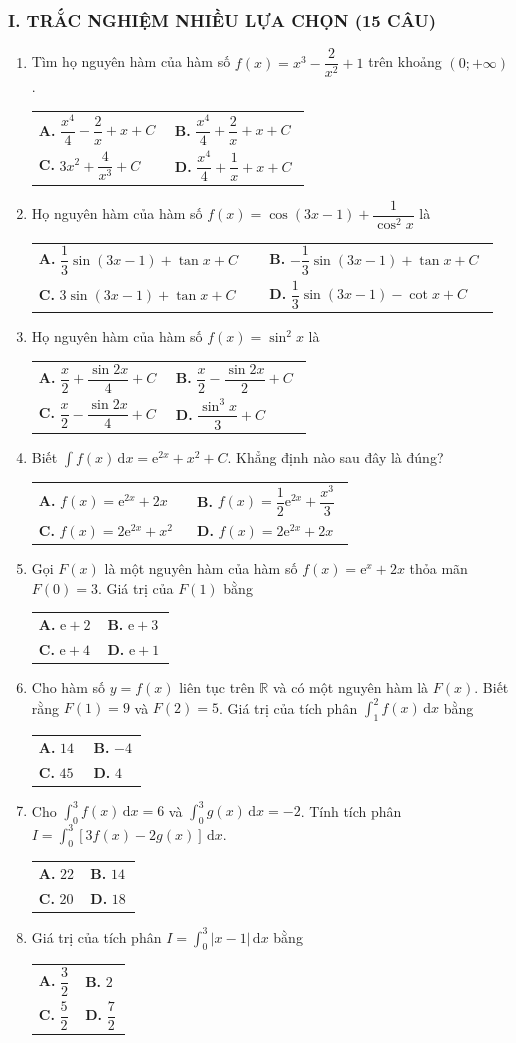 \documentclass[12pt,a4paper]{article}
\makeatletter
\newcommand{\bonpa}[4]{\par\nobreak\smallskip\nobreak\noindent
\begin{tabular}{@{}p{0.48\linewidth}p{0.48\linewidth}@{}}
\textbf{A.} #1 & \textbf{B.} #2\\[7pt]
\textbf{C.} #3 & \textbf{D.} #4\end{tabular}}
\makeatother
\begin{document}
\subsubsection*{I. TRẮC NGHIỆM NHIỀU LỰA CHỌN (15 CÂU)}

\begin{enumerate}[start=16]
\item Tìm họ nguyên hàm của hàm số $f(x) = x^3 - \dfrac{2}{x^2} + 1$ trên khoảng $(0; +\infty)$.
\bonpa{$\dfrac{x^4}{4} - \dfrac{2}{x} + x + C$}{$\dfrac{x^4}{4} + \dfrac{2}{x} + x + C$}{$3x^2 + \dfrac{4}{x^3} + C$}{$\dfrac{x^4}{4} + \dfrac{1}{x} + x + C$}

\item Họ nguyên hàm của hàm số $f(x) = \cos(3x - 1) + \dfrac{1}{\cos^2 x}$ là
\bonpa{$\dfrac{1}{3}\sin(3x-1) + \tan x + C$}{$-\dfrac{1}{3}\sin(3x-1) + \tan x + C$}{$3\sin(3x-1) + \tan x + C$}{$\dfrac{1}{3}\sin(3x-1) - \cot x + C$}

\item Họ nguyên hàm của hàm số $f(x) = \sin^2 x$ là
\bonpa{$\dfrac{x}{2} + \dfrac{\sin 2x}{4} + C$}{$\dfrac{x}{2} - \dfrac{\sin 2x}{2} + C$}{$\dfrac{x}{2} - \dfrac{\sin 2x}{4} + C$}{$\dfrac{\sin^3 x}{3} + C$}

\item Biết $\int f(x)\,\mathrm{d}x = \mathrm{e}^{2x} + x^2 + C$. Khẳng định nào sau đây là đúng?
\bonpa{$f(x) = \mathrm{e}^{2x} + 2x$}{$f(x) = \dfrac{1}{2}\mathrm{e}^{2x} + \dfrac{x^3}{3}$}{$f(x) = 2\mathrm{e}^{2x} + x^2$}{$f(x) = 2\mathrm{e}^{2x} + 2x$}

\item Gọi $F(x)$ là một nguyên hàm của hàm số $f(x) = \mathrm{e}^x + 2x$ thỏa mãn $F(0) = 3$. Giá trị của $F(1)$ bằng
\bonpa{$\mathrm{e} + 2$}{$\mathrm{e} + 3$}{$\mathrm{e} + 4$}{$\mathrm{e} + 1$}

\item Cho hàm số $y = f(x)$ liên tục trên $\mathbb{R}$ và có một nguyên hàm là $F(x)$. Biết rằng $F(1) = 9$ và $F(2) = 5$. Giá trị của tích phân $\int_1^2 f(x)\,\mathrm{d}x$ bằng
\bonpa{$14$}{$-4$}{$45$}{$4$}

\item Cho $\int_0^3 f(x)\,\mathrm{d}x = 6$ và $\int_0^3 g(x)\,\mathrm{d}x = -2$. Tính tích phân $I = \int_0^3 [3f(x) - 2g(x)]\,\mathrm{d}x$.
\bonpa{$22$}{$14$}{$20$}{$18$}

\item Giá trị của tích phân $I = \int_0^3 |x - 1|\,\mathrm{d}x$ bằng
\bonpa{$\dfrac{3}{2}$}{$2$}{$\dfrac{5}{2}$}{$\dfrac{7}{2}$}


\end{enumerate}
\end{document}
